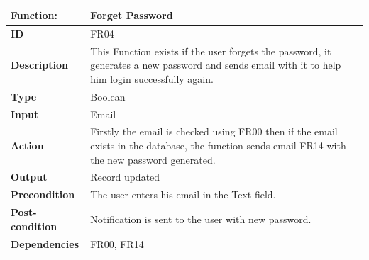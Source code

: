 \documentclass[]{article}
\begin{document}
\FloatBarrier
\begin{table}[h]
\caption{ }
\label{tab:my-table}
\begin{tabular}{|p{}|p{}|}
\hline
\textbf{Function:} & Forget Password
\\ \hline
\textbf{ID}  &            FR04

\\ \hline
\textbf{Description}    &       This Function exists if the user forgets the password, it generates a new password and sends email with it to help him login successfully again.                                                               
\\ \hline
\textbf{Type}    &       Boolean  

\\ \hline
\textbf{Input}        & Email


\\ \hline
\textbf{Action}            & Firstly the email is checked using FR00 then if the email exists in the database, the function sends email FR14 with the new password generated.

\\ \hline
\textbf{Output}            & Record updated

\\ \hline
\textbf{Precondition}           &   The user enters his email in the Text field.

\\ \hline
\textbf{Post-condition}     & Notification is sent to the user with new password.


\\ \hline
\textbf{Dependencies}           & FR00, FR14
\\ \hline
\end{tabular}
\end{table}
\end{document}
